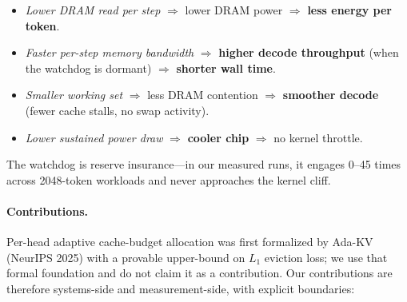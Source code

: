 \documentclass[sigconf, anonymous=false, screen=true]{acmart}
\begin{document}
\begin{itemize}
\item \emph{Lower DRAM read per step} $\Rightarrow$ lower DRAM power $\Rightarrow$ \textbf{less energy per token}.
\item \emph{Faster per-step memory bandwidth} $\Rightarrow$ \textbf{higher decode throughput} (when the watchdog is dormant) $\Rightarrow$ \textbf{shorter wall time}.
\item \emph{Smaller working set} $\Rightarrow$ less DRAM contention $\Rightarrow$ \textbf{smoother decode} (fewer cache stalls, no swap activity).
\item \emph{Lower sustained power draw} $\Rightarrow$ \textbf{cooler chip} $\Rightarrow$ no kernel throttle.
\end{itemize}

The watchdog is reserve insurance---in our measured runs, it engages 0--45 times across 2048-token workloads and never approaches the kernel cliff.

\paragraph{Contributions.} Per-head adaptive cache-budget allocation was first formalized by Ada-KV~\cite{feng2025adakv} (NeurIPS 2025) with a provable upper-bound on $L_1$ eviction loss; we use that formal foundation and do not claim it as a contribution. Our contributions are therefore systems-side and measurement-side, with explicit boundaries:
\end{document}

